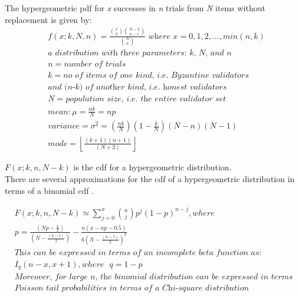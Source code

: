 \documentclass[UTF8]{article}
\begin{document}
\noindent
The hypergeometric \gls{pdf} for \textit{x} successes in \textit{n} trials from \textit{N} items without replacement is given by:
\begin{equation*}
\begin{split}
& f(x; k, N, n) = \frac{\binom{x}{k} \binom{N-k}{n-x}}{\binom{N}{n}} \textit{ where } x = 0, 1, 2, ..., min(n,k) \\
& \textit{a distribution with three parameters: k, N, and n} \\
& n = \textit{number of trials} \\
& k = \textit{no of items of one kind, i.e. Byzantine validators}  \\
& \textit{and (n-k) of another kind, i.e. honest validators} \\
& N = \textit{population size, i.e. the entire validator set} \\
& mean: \mu = \frac{nk}{N} = np \\
& variance = \sigma^2 = \left( \frac{nk}{N} \right) \left(1 - \frac{k}{N} \right) (N-n)(N-1) \\
& mode = \left\lfloor \frac{(k+1)(n+1)}{(N+2)} \right\rfloor
\end{split}
\end{equation*}


\noindent
$F (x; k, n, N-k)$ is the \gls{cdf} for a hypergeometric distribution.\\
\noindent
There are several approximations for the \gls{cdf} of a hypergeometric distribution in terms of a binomial \gls{cdf} \cite{chattamvelli}.
 
\begin{equation*}
\begin{split}
& F (x; k, n, N-k) \simeq \sum_{j=0}^x \binom{n}{j}p^j(1-p)^{n-j}, where \\
& p = \frac{\left( Np - \frac{x}{2} \right)}{\left( N - \frac{(n-1)}{2} \right)} - \frac{n(x - np - 0.5)}{6 (N - \frac{(n-1)}{2} )^2}\\
& \textit{This can be expressed in terms of an incomplete beta function as:} \\
& I_q(n-x, x+1), where \texttt{ } q = 1- p \\
& \textit{Moreover, for large n, the binomial distribution can be expressed in terms of an F distribution, and} \\
& \textit{Poisson tail probabilities in terms of a Chi-square distribution}\\
\end{split}
\end{equation*}
\end{document}
